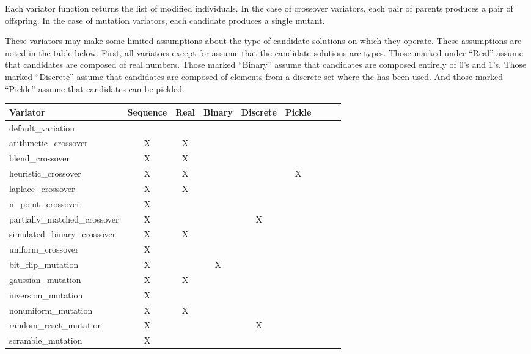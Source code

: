 \documentclass[letterpaper,10pt,english]{sphinxmanual}
\begin{document}
Each variator function returns the list of modified individuals. In 
the case of crossover variators, each pair of parents produces a pair
of offspring. In the case of mutation variators, each candidate
produces a single mutant.

These variators may make some limited assumptions about the type of
candidate solutions on which they operate. These assumptions are noted
in the table below. First, all variators except for  
assume that the candidate solutions are  types. Those marked
under ``Real'' assume that candidates are composed of real numbers. Those
marked ``Binary'' assume that candidates are composed entirely of 0's and 1's.
Those marked ``Discrete'' assume that candidates are composed of elements
from a discrete set where the  has been used. And 
those marked ``Pickle'' assume that candidates can be pickled.

\begin{tabulary}{\linewidth}{|l|c|c|c|c|c|c|c|c|}
\hline
\textbf{
Variator
} & \textbf{
Sequence
} & \textbf{
Real
} & \textbf{
Binary
} & \textbf{
Discrete
} & \textbf{
Pickle
}\\\hline

default\_variation
 &  &  &  &  & \\\hline

arithmetic\_crossover
 & 
X
 & 
X
 &  &  & \\\hline

blend\_crossover
 & 
X
 & 
X
 &  &  & \\\hline

heuristic\_crossover
 & 
X
 & 
X
 &  &  & 
X
\\\hline

laplace\_crossover
 & 
X
 & 
X
 &  &  & \\\hline

n\_point\_crossover
 & 
X
 &  &  &  & \\\hline

partially\_matched\_crossover
 & 
X
 &  &  & 
X
 & \\\hline

simulated\_binary\_crossover
 & 
X
 & 
X
 &  &  & \\\hline

uniform\_crossover
 & 
X
 &  &  &  & \\\hline

bit\_flip\_mutation
 & 
X
 &  & 
X
 &  & \\\hline

gaussian\_mutation
 & 
X
 & 
X
 &  &  & \\\hline

inversion\_mutation
 & 
X
 &  &  &  & \\\hline

nonuniform\_mutation
 & 
X
 & 
X
 &  &  & \\\hline

random\_reset\_mutation
 & 
X
 &  &  & 
X
 & \\\hline

scramble\_mutation
 & 
X
 &  &  &  & \\\hline
\end{tabulary}
\end{document}

